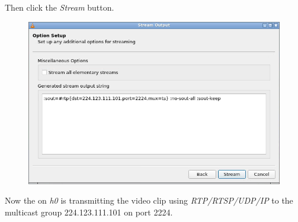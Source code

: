 \documentclass{../UTNetLab}
\begin{document}
Then click the \textit{Stream} button.
\begin{figure}[H]
    \centering
    \includegraphics[scale=1.8]{img/stream5}
\end{figure}
Now the  on \textit{h0} is transmitting the video clip using \textit{RTP/RTSP/UDP/IP} to the multicast group {224.123.111.101} on port {2224}.
\end{document}
